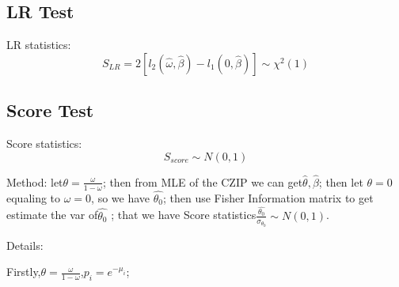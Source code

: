\documentclass[11pt]{article}
\numberwithin{equation}{section}
\begin{document}
\subsection{LR Test}  \label{sec3-2}
LR statistics:
$$ S_{LR}=2\left[ l_2(\hat{\omega},\hat{\beta})- l_1(0,\hat{\beta}) \right]\sim \chi^2(1)
$$

\subsection{Score Test}  \label{sec3-3}
Score statistics:
            $$ S_{score}\sim N(0,1) $$

Method:
let$\theta = \frac{\omega}{1-\omega}$;
then from MLE of the CZIP we can get$\hat{\theta},\hat{\beta}$;
then let $\theta =0$equaling to $\omega=0$, so we have $\hat{\theta_0}$;
then use Fisher Information matrix to get estimate the var of$\hat{\theta_0}$ ;
that we have Score statistics$ \frac{\hat{\theta_0}}{\sigma_{\theta_0}}\sim N(0,1)$.

Details:

Firstly,$\theta = \frac{\omega}{1-\omega}$,$p_i=e^{-\mu_i}$;
\end{document}
